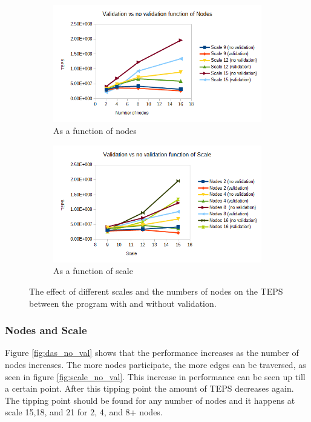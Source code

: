 \begin{figure}[!h]
\centering
\begin{subfigure}{.5\textwidth}
  \centering
  \includegraphics[width=\linewidth]{images/nodes_scale_vs_noscale.png}
  \caption{As a function of nodes}
  \label{fig:nodes_val_noval}
\end{subfigure}%
\begin{subfigure}{.5\textwidth}
  \centering
  \includegraphics[width=\linewidth]{images/scale_val_vs_noval.png}
  \caption{As a function of scale}
  \label{fig:scale_val_noval}
\end{subfigure}
\caption{The effect of different scales and the numbers of nodes on the TEPS between the program with and without validation.}
\label{fig:val_vs_noval}
\end{figure}

\subsubsection{Nodes and Scale}
\label{res:nodes_scale}
Figure \ref{fig:das_no_val} shows that the performance increases as the number of nodes increases. The more nodes participate, the more edges can be traversed, as seen in figure \ref{fig:scale_no_val}. This increase in performance can be seen up till a certain point. After this tipping point the amount of TEPS decreases again. The tipping point should be found for any number of nodes and it happens at scale 15,18, and 21 for 2, 4, and 8+ nodes. 


